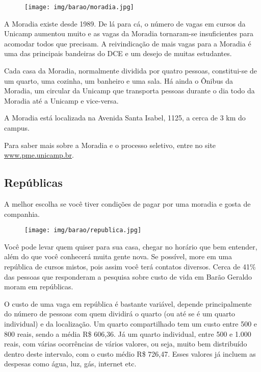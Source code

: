 \begin{figure}[h!]
  \centering
  \texttt{[image: img/barao/moradia.jpg]}
\end{figure}

A Moradia existe desde 1989. De lá para cá, o número de vagas em cursos da
Unicamp aumentou muito e as vagas da Moradia tornaram-se insuficientes para
acomodar todos que precisam. A reivindicação de mais vagas para a Moradia é uma
das principais bandeiras do DCE e um desejo de muitas estudantes.

Cada casa da Moradia, normalmente dividida por quatro pessoas, constitui-se de
um quarto, uma cozinha, um banheiro e uma sala. Há ainda o Ônibus da Moradia,
um circular da Unicamp que transporta pessoas durante o dia todo da Moradia até
a Unicamp e vice-versa.

A Moradia está localizada na Avenida Santa Isabel, 1125, a cerca de 3 km do
campus.

Para saber mais sobre a Moradia e o processo seletivo, entre no site
\url{www.pme.unicamp.br}.

\subsection{Repúblicas}

A melhor escolha se você tiver condições de pagar por uma moradia e gosta de
companhia.

\begin{figure}[h!]
  \centering
  \texttt{[image: img/barao/republica.jpg]}
\end{figure}

Você pode levar quem quiser para sua casa, chegar no horário que bem entender,
além do que você conhecerá muita gente nova. Se possível, more em uma república
de cursos mistos, pois assim você terá contatos diversos. Cerca de 41\% das
pessoas que responderam a pesquisa sobre custo de vida em Barão Geraldo moram
em repúblicas.

O custo de uma vaga em república é bastante variável, depende principalmente do
número de pessoas com quem dividirá o quarto (ou até se é um quarto individual)
e da localização. Um quarto compartilhado tem um custo entre 500 e 800 reais,
sendo a média R\$ 606,36. Já um quarto individual, entre 500 e 1.000 reais,
com várias ocorrências de vários valores, ou seja, muito bem distribuído dentro
deste intervalo, com o custo médio R\$ 726,47. Esses valores já incluem as
despesas como água, luz, gás, internet etc.

